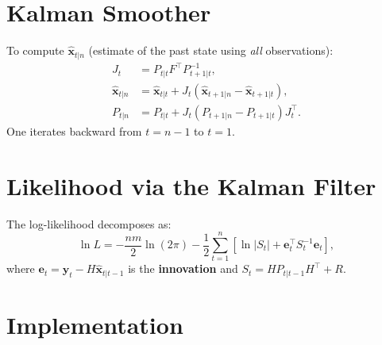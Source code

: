 \section{Kalman Smoother}

\begin{definition}
To compute $\hat{\bm{x}}_{t|n}$ (estimate of the past state using \emph{all} observations):
\begin{align}
J_t &= P_{t|t}F^\top P_{t+1|t}^{-1}, \\
\hat{\bm{x}}_{t|n} &= \hat{\bm{x}}_{t|t} + J_t(\hat{\bm{x}}_{t+1|n}-\hat{\bm{x}}_{t+1|t}), \\
P_{t|n} &= P_{t|t} + J_t(P_{t+1|n}-P_{t+1|t})J_t^\top.
\end{align}
One iterates backward from $t=n-1$ to $t=1$.
\end{definition}

\section{Likelihood via the Kalman Filter}

\begin{theorem}
The log-likelihood decomposes as:
\[
\ln L = -\frac{nm}{2}\ln(2\pi) - \frac{1}{2}\sum_{t=1}^n\left[\ln|S_t| + \bm{e}_t^\top S_t^{-1}\bm{e}_t\right],
\]
where $\bm{e}_t = \bm{y}_t-H\hat{\bm{x}}_{t|t-1}$ is the \textbf{innovation} and $S_t = HP_{t|t-1}H^\top+R$.
\end{theorem}

\section{Implementation}


